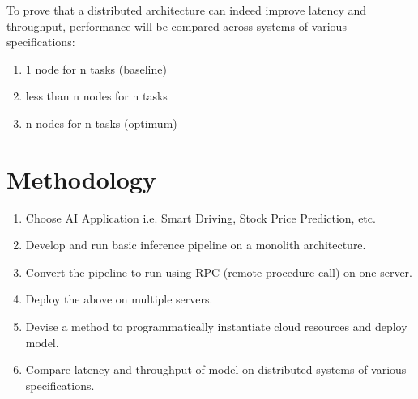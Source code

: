 \documentclass{article}
\begin{document}
To prove that a distributed architecture can indeed improve latency and throughput, performance will be compared across systems of various specifications:
\begin{enumerate}
  \item 1 node for n tasks (baseline)
  \item less than n nodes for n tasks
  \item n nodes for n tasks (optimum)
\end{enumerate}

\section{Methodology}

\begin{enumerate}
  \item Choose AI Application i.e. Smart Driving, Stock Price Prediction, etc.
  \item Develop and run basic inference pipeline on a monolith architecture.
  \item Convert the pipeline to run using RPC (remote procedure call) on one server.
  \item Deploy the above on multiple servers.
  \item Devise a method to programmatically instantiate cloud resources and deploy model.
  \item Compare latency and throughput of model on distributed systems of various specifications.
\end{enumerate}
\end{document}
